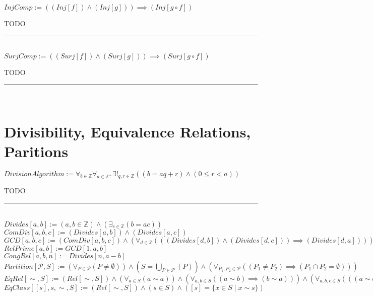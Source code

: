 \documentclass{book}
\newcommand{\abr}{:=}
\newcommand{\st}{\mathbin{|}}
\begin{document}
$InjComp \abr ((Inj[f]) \land (Inj[g])) \implies (Inj[g \circ f])$
\begin{enumerate}
  \lit TODO
\end{enumerate} \vspace{.75mm} \hrule \vspace{.75mm} \ \\

$SurjComp \abr ((Surj[f]) \land (Surj[g])) \implies (Surj[g \circ f])$
\begin{enumerate}
  \lit TODO
\end{enumerate} \vspace{.75mm} \hrule \vspace{.75mm} \ \\


\section{Divisibility, Equivalence Relations, Paritions}
$DivisionAlgorithm \abr \forall_{b \in \mathbb{Z}} \forall_{a \in \mathbb{Z}^+} \exists!_{q, r \in \mathbb{Z}}((b = a q + r) \land (0 \leq r < a))$
\begin{enumerate}
  \lit TODO
\end{enumerate} \vspace{.75mm} \hrule \vspace{.75mm} \ \\

$Divides[a, b] \abr (a, b \in \mathbb{Z}) \land (\exists_{c \in \mathbb{Z}}(b = a c))$ \\
$ComDiv[a, b, c] \abr (Divides[a, b]) \land (Divides[a, c])$ \\
$GCD[a, b, c] \abr (ComDiv[a, b, c]) \land (\forall_{d \in \mathbb{Z}}(((Divides[d, b]) \land (Divides[d, c])) \implies (Divides[d, a])))$ \\
$RelPrime[a, b] \abr GCD[1, a, b]$ \\
$CongRel[a, b, n] \abr Divides[n, a - b]$ \\

$Partition[\mathcal{P}, S] \abr (\forall_{P \in \mathcal{P}}(P \neq \emptyset)) \land (S = \bigcup\limits_{P \in \mathcal{P}}(P)) \land (\forall_{P_1, P_2 \in \mathcal{P}}((P_1 \neq P_2) \implies (P_1 \cap P_2 = \emptyset)))$ \\
$EqRel[\sim, S] \abr (Rel[\sim, S]) \land (\forall_{a \in S}(a \sim a)) \land (\forall_{a, b \in S}((a \sim b) \implies (b \sim a))) \land (\forall_{a, b, c \in S}(((a \sim b) \land (b \sim c)) \implies (a \sim c)))$ \\
$EqClass[[s], s, \sim, S] \abr (Rel[\sim, S]) \land (s \in S) \land ([s] = \{x \in S \st x \sim s\})$ \\
\end{document}
